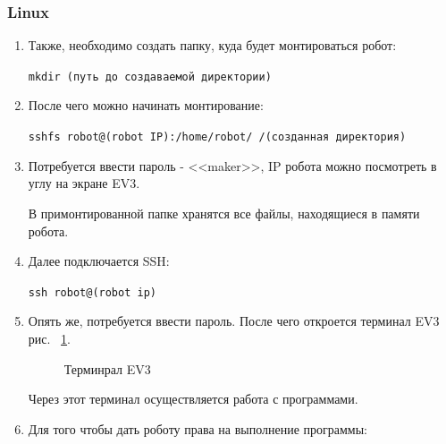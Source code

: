 \documentclass[12pt,a4paper,openany]{extarticle}
\begin{document}
\subsubsection{Linux}
\begin{enumerate}

 начала необходимо установить на компьютер sshfs, используя команду:

\verb|sudo apt-get install sshfs|\

\item Также, необходимо создать папку, куда будет монтироваться робот:

\verb|mkdir (путь до создаваемой директории)|\

\item После чего можно начинать монтирование:

\verb|sshfs robot@(robot IP):/home/robot/ /(созданная директория)|\

\item Потребуется ввести пароль - <<maker>>, IP робота можно посмотреть в углу на экране EV3.

В примонтированной папке хранятся все файлы, находящиеся в памяти робота.

\item Далее подключается  SSH:

\verb|ssh robot@(robot ip)|\

\item Опять же, потребуется ввести пароль. После чего откроется терминал EV3 рис. ~\ref{terminal_ev3}.
\begin{figure}[h]
	\noindent{}
	\caption{Терминрал EV3}
	\label{terminal_ev3}
\end{figure}
Через этот терминал осуществляется работа с программами.
\item Для того чтобы дать роботу права на выполнение программы:\label{ev3 commands}


\end{enumerate}
\end{document}
